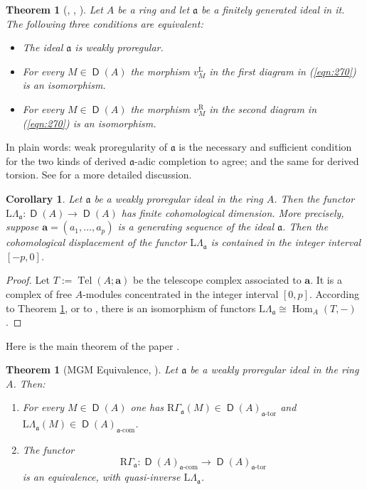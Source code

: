 \documentclass[10pt]{amsart}
\newtheorem{thm}[equation]{Theorem}
\newtheorem{cor}[equation]{Corollary}
\theoremstyle{definition}
\numberwithin{equation}{section}
\newcommand{\opn}{\operatorname}
\newcommand{\cat}[1]{\operatorname{\mathsf{#1}}}
\newcommand{\rmitem}[1]{\item[\textrm{(#1)}]}
\newcommand{\mfrak}[1]{\mathfrak{#1}}
\newcommand{\mrm}[1]{\mathrm{#1}}
\newcommand{\La}{\Lambda}
\renewcommand{\a}{\mfrak{a}}
\newcommand{\ba}{\bsym{a}}
\newcommand{\tup}[1]{\textrm{#1}}
\newcommand{\bsym}[1]{\boldsymbol{#1}}
\begin{document}
\begin{thm}[\cite{PSY1}, \cite{Po2}, {\cite[Theorem 3.11]{Ye6}}]
\label{thm:270}
Let $A$ be a ring and let $\a$ be a finitely generated ideal in it.
The following three conditions are equivalent:
\begin{itemize}
\rmitem{i} The ideal $\a$ is weakly proregular.

\rmitem{ii} For every $M \in \cat{D}(A)$ the morphism $v^{\mrm{L}}_{M}$ in the
first diagram in (\ref{eqn:270}) is an isomorphism.

\rmitem{iii} For every $M \in \cat{D}(A)$ the morphism $v^{\mrm{R}}_{M}$ in the
second diagram in (\ref{eqn:270}) is an isomorphism.
\end{itemize}
\end{thm}

In plain words: weak proregularity of $\a$ is the necessary and sufficient
condition for the two kinds of derived $\a$-adic completion to agree; and the
same for derived torsion. See \cite[Section 3]{Ye6} for a more detailed
discussion.

\begin{cor} \label{cor:440}
Let $\a$ be a weakly proregular ideal in the ring $A$. Then the functor
$\mrm{L} \La_{\a} : \cat{D}(A) \to \cat{D}(A)$ has finite cohomological
dimension. More precisely, suppose
$\ba = (a_1, \ldots, a_p)$ is a generating sequence of the ideal $\a$. Then the
cohomological displacement of the functor $\mrm{L} \La_{\a}$ is contained in
the integer interval $[-p, 0]$.
\end{cor}

\begin{proof}
Let $T := \opn{Tel}(A; \ba)$ be the telescope complex associated to $\ba$.
It is a complex of free $A$-modules concentrated in the integer interval
$[0, p]$. According to Theorem \ref{thm:270}, or to
\cite[Corollary 5.25]{PSY1}, there is an isomorphism of
functors $\mrm{L} \La_{\a} \cong \opn{Hom}_A(T, -)$.
\end{proof}

Here is the main theorem of the paper \cite{PSY1}.

\begin{thm}[MGM Equivalence, {\cite[Theorem 1.1]{PSY1}}] \label{thm:271}
Let $\a$ be a weakly proregular ideal in the ring $A$. Then:
\begin{enumerate}
\item For every $M \in \cat{D}(A)$ one has
$\mrm{R} \Gamma_{\a} (M) \in \cat{D}(A)_{\a \tup{-tor}}$
and
$\mrm{L} \Lambda_{\a} (M) \in \cat{D}(A)_{\a \tup{-com}}$.

\item The functor
\[ \mrm{R} \Gamma_{\a} :
\cat{D}(A)_{\a \tup{-com}} \to
\cat{D}(A)_{\a \tup{-tor}} \]
is an equivalence, with quasi-inverse $\mrm{L} \Lambda_{\a}$.
\end{enumerate}
\end{thm}
\end{document}
